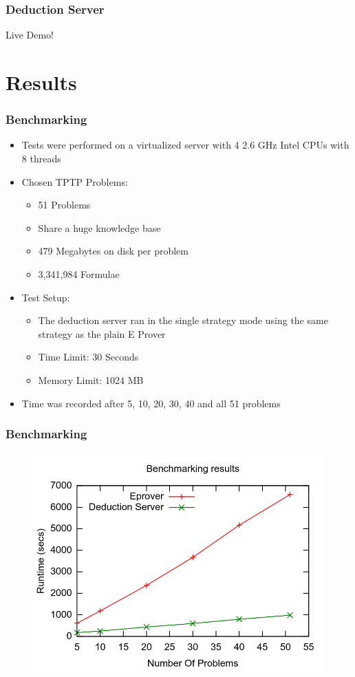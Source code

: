 \documentclass[10pt]{beamer}
\begin{document}
\begin{frame}[fragile]
  \frametitle{Deduction Server}
  \begin{center}
  Live Demo!
  \end{center}
\end{frame}

\section{Results}
\begin{frame}[fragile]
  \frametitle{Benchmarking}
  \begin{itemize}[<+- | alert@+>]
    \item Tests were performed on a virtualized server with 4 2.6 GHz Intel CPUs with 8 threads
    \item Chosen TPTP Problems:
      \begin{itemize}
        \item 51 Problems
        \item Share a huge knowledge base
        \item 479 Megabytes on disk per problem
        \item 3,341,984 Formulae
      \end{itemize}
    \item Test Setup:
      \begin{itemize}
        \item The deduction server ran in the single strategy mode using the same strategy as the plain E Prover
        \item Time Limit: 30 Seconds
        \item Memory Limit: 1024 MB
      \end{itemize}
    \item Time was recorded after 5, 10, 20, 30, 40 and all 51 problems
  \end{itemize}
\end{frame}


\begin{frame}[fragile]
  \frametitle{Benchmarking}
\begin{figure} \includegraphics[width=\linewidth,height=0.9\textheight,keepaspectratio]{imgs/BenchmarkingResults.png} \end{figure}
\end{frame}
\end{document}
